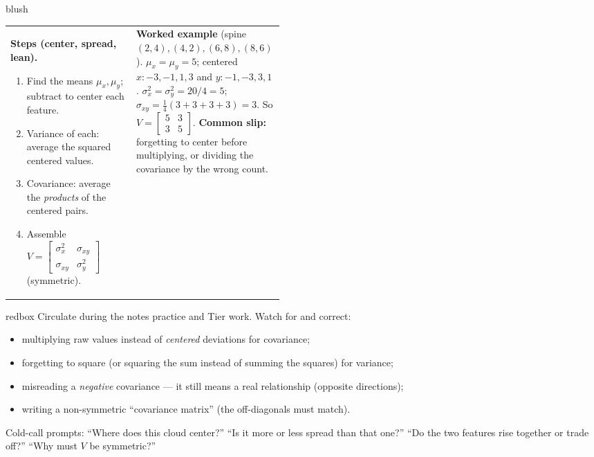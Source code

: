 \documentclass[10pt]{article}
\begin{document}
\begin{skillbox}{blush}
\begin{tabularx}{\linewidth}{@{}p{0.46\linewidth} X@{}}
\textbf{Steps (center, spread, lean).}
\begin{enumerate}[leftmargin=1.3em, nosep, after=\vspace{2pt}]
  \item Find the means $\mu_x,\mu_y$; subtract to center each feature.
  \item Variance of each: average the squared centered values.
  \item Covariance: average the \emph{products} of the centered pairs.
  \item Assemble $V=\left[\begin{smallmatrix}\sigma_x^2 & \sigma_{xy}\\ \sigma_{xy} & \sigma_y^2\end{smallmatrix}\right]$ (symmetric).
\end{enumerate}
&
\textbf{Worked example} (spine $(2,4),(4,2),(6,8),(8,6)$). $\mu_x=\mu_y=5$; centered $x:-3,-1,1,3$ and
$y:-1,-3,3,1$. $\sigma_x^2=\sigma_y^2=20/4=5$; $\sigma_{xy}=\frac14(3+3+3+3)=3$. So
$V=\left[\begin{smallmatrix}5&3\\3&5\end{smallmatrix}\right]$. \textbf{Common slip:} forgetting to center before
multiplying, or dividing the covariance by the wrong count.
\end{tabularx}
\end{skillbox}

\begin{skillbox}{redbox}
Circulate during the notes practice and Tier work. Watch for and correct:
\begin{itemize}[leftmargin=1.2em, nosep]
  \item multiplying raw values instead of \emph{centered} deviations for covariance;
  \item forgetting to square (or squaring the sum instead of summing the squares) for variance;
  \item misreading a \emph{negative} covariance --- it still means a real relationship (opposite directions);
  \item writing a non-symmetric ``covariance matrix'' (the off-diagonals must match).
\end{itemize}
Cold-call prompts: ``Where does this cloud center?'' ``Is it more or less spread than that one?'' ``Do the two
features rise together or trade off?'' ``Why must $V$ be symmetric?''
\end{skillbox}
\end{document}
